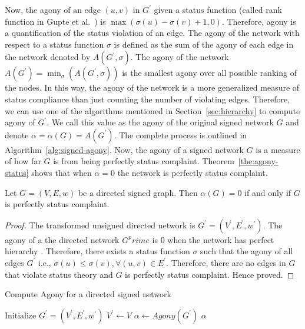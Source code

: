 Now, the agony of an edge $(u,v)$ in $G^\prime$ given a status function (called rank function in Gupte et al.\ \cite{gupte2011finding}) is $\max(\sigma(u)-\sigma(v)+1,0)$. Therefore, agony is a quantification of the status violation of an edge. The agony of the network with respect to a status function $\sigma$ is defined as the sum of the agony of each edge in the network denoted by $A(G^\prime,\sigma)$. The agony of the network $A(G^\prime)= \min_\sigma(A(G^\prime,\sigma))$ is the smallest agony over all possible ranking of the nodes. In this way, the agony of the network is a more generalized measure of status compliance than just counting the number of violating edges. Therefore, we can use one of the algorithms mentioned in Section~\ref{sec:hierarchy} to compute agony of $G^\prime$. We call this value as the agony of the original signed network $G$ and denote $\alpha = \alpha(G) = A(G^\prime)$. The complete process is outlined in Algorithm~\ref{alg:signed-agony}. Now, the agony of a signed network $G$ is a measure of how far $G$ is from being perfectly status complaint. Theorem~\ref{the:agony-status} shows that when $\alpha=0$ the network is perfectly status complaint. 

\begin{theorem}
\label{the:agony-status}
Let $G=(V,E,w)$ be a directed signed graph. Then $\alpha(G)=0$ if and only if $G$ is perfectly status complaint.
\end{theorem}
\begin{proof}
    The transformed unsigned directed network is $G^\prime=(V^\prime,E^\prime,w^\prime)$. The agony of a the directed network $G^prime$ is 0 when the network has perfect hierarchy \cite{gupte2011finding}. Therefore, there exists a status function $\sigma$ such that the agony of all edges $G^\prime$ i.e., $\sigma(u) \leq \sigma(v), \forall (u,v)\in E^\prime$. Therefore, there are no edges in $G$ that violate status theory and $G$ is perfectly status complaint. Hence proved.
\end{proof}

\begin{algorithm}[htp]
    \DontPrintSemicolon
    \caption{Compute Agony for a directed signed network }
    \label{alg:signed-agony}
    Initialize $G^\prime = (V^\prime,E^\prime,w^\prime)$\;
    $V^\prime \leftarrow V$\;
    $\alpha \leftarrow Agony(G^\prime)$\; 
    \Return $\alpha$\;
\end{algorithm}

